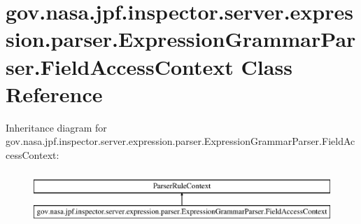 \hypertarget{classgov_1_1nasa_1_1jpf_1_1inspector_1_1server_1_1expression_1_1parser_1_1_expression_grammar_parser_1_1_field_access_context}{}\section{gov.\+nasa.\+jpf.\+inspector.\+server.\+expression.\+parser.\+Expression\+Grammar\+Parser.\+Field\+Access\+Context Class Reference}
\label{classgov_1_1nasa_1_1jpf_1_1inspector_1_1server_1_1expression_1_1parser_1_1_expression_grammar_parser_1_1_field_access_context}
Inheritance diagram for gov.\+nasa.\+jpf.\+inspector.\+server.\+expression.\+parser.\+Expression\+Grammar\+Parser.\+Field\+Access\+Context\+:\begin{figure}[H]
\begin{center}
\leavevmode
\includegraphics[height=1.985816cm]{classgov_1_1nasa_1_1jpf_1_1inspector_1_1server_1_1expression_1_1parser_1_1_expression_grammar_parser_1_1_field_access_context}
\end{center}
\end{figure}
